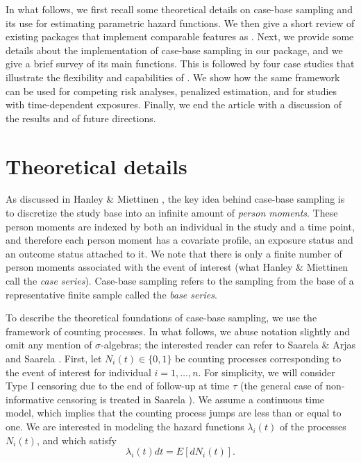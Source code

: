 \documentclass[
]{jss}
\begin{document}
In what follows, we first recall some theoretical details on case-base
sampling and its use for estimating parametric hazard functions. We then
give a short review of existing  packages that implement
comparable features as . Next, we provide some details
about the implementation of case-base sampling in our package, and we
give a brief survey of its main functions. This is followed by four case
studies that illustrate the flexibility and capabilities of
. We show how the same framework can be used for competing
risk analyses, penalized estimation, and for studies with time-dependent
exposures. Finally, we end the article with a discussion of the results
and of future directions.

\hypertarget{theory}{%
\section{Theoretical details}\label{theory}}

As discussed in Hanley \& Miettinen \citeyearpar{hanley2009fitting}, the
key idea behind case-base sampling is to discretize the study base into
an infinite amount of \emph{person moments}. These person moments are
indexed by both an individual in the study and a time point, and
therefore each person moment has a covariate profile, an exposure status
and an outcome status attached to it. We note that there is only a
finite number of person moments associated with the event of interest
(what Hanley \& Miettinen call the \emph{case series}). Case-base
sampling refers to the sampling from the base of a representative finite
sample called the \emph{base series}.

To describe the theoretical foundations of case-base sampling, we use
the framework of counting processes. In what follows, we abuse notation
slightly and omit any mention of \(\sigma\)-algebras; the interested
reader can refer to Saarela \& Arjas \citeyearpar{saarela2015non} and
Saarela \citeyearpar{saarela2016case}. First, let
\(N_{i}(t) \in \{0, 1\}\) be counting processes corresponding to the
event of interest for individual \(i=1, \ldots,n\). For simplicity, we
will consider Type I censoring due to the end of follow-up at time
\(\tau\) (the general case of non-informative censoring is treated in
Saarela \citeyearpar{saarela2016case}). We assume a continuous time
model, which implies that the counting process jumps are less than or
equal to one. We are interested in modeling the hazard functions
\(\lambda_{i}(t)\) of the processes \(N_i(t)\), and which satisfy
\[\lambda_{i}(t) dt = E[dN_{i}(t)].\]
\end{document}
